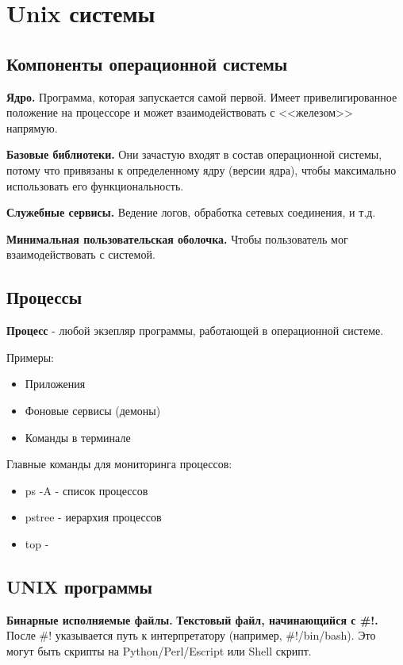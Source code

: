 \section{Unix системы}

\subsection{Компоненты операционной системы}

\textbf{Ядро.} Программа, которая запускается самой первой. Имеет привелигированное
положение на процессоре и может взаимодействовать с <<железом>> напрямую.

\textbf{Базовые библиотеки.} Они зачастую входят в состав операционной системы, потому что 
привязаны к определенному ядру (версии ядра), чтобы максимально использовать его функциональность. 

\textbf{Служебные сервисы.} Ведение логов, обработка сетевых соединения, и т.д.

\textbf{Минимальная пользовательская оболочка.} Чтобы пользователь мог взаимодействовать с системой.

\subsection{Процессы}

\textbf{Процесс} - любой экзепляр программы, работающей в операционной системе.

Примеры:
\begin{itemize}
	\item Приложения
	\item Фоновые сервисы (демоны)
	\item Команды в терминале
\end{itemize}

Главные команды для мониторинга процессов:
\begin{itemize}
	\item ps -A - список процессов
	\item pstree - иерархия процессов
	\item top - 
\end{itemize}

\subsection{UNIX программы}

\textbf{Бинарные исполняемые файлы.} 
\textbf{Текстовый файл, начинающийся с \#!.} После \#! указывается путь к интерпретатору (например, \#!/bin/bash). Это могут быть скрипты на Python/Perl/Escript или Shell скрипт.

